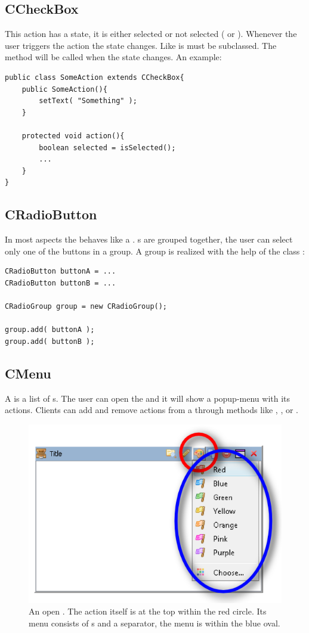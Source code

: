 \subsection{CCheckBox}
This action has a state, it is either selected or not selected ( or ). Whenever the user triggers the action the state changes. Like  is must be subclassed. The method  will be called when the state changes. An example:
\begin{lstlisting}
public class SomeAction extends CCheckBox{
	public SomeAction(){
		setText( "Something" );
	}
	
	protected void action(){
		boolean selected = isSelected();
		...
	}
}
\end{lstlisting}

\subsection{CRadioButton}
In most aspects the  behaves like a . s are grouped together, the user can select only one of the buttons in a group. A group is realized with the help of the class :
\begin{lstlisting}
CRadioButton buttonA = ...
CRadioButton buttonB = ...

CRadioGroup group = new CRadioGroup();

group.add( buttonA );
group.add( buttonB );
\end{lstlisting}

\subsection{CMenu}
A  is a list of s. The user can open the  and it will show a popup-menu with its actions. Clients can add and remove actions from a  through methods like , , or .

\begin{figure}[ht]
\centering
\includegraphics[scale=0.75]{actions/cmenu}
\caption{An open . The action itself is at the top within the red circle. Its menu consists of s and a separator, the menu is within the blue oval.}
\label{fig:cmenu}
\end{figure}

